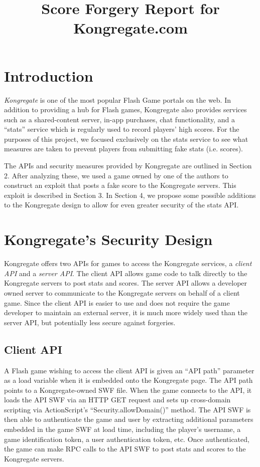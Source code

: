 \documentclass [11pt,twocolumn] {article}
\begin{document}
\title { Score Forgery Report for Kongregate.com}

\maketitle

\section { Introduction }

\emph{Kongregate} is one of the most popular Flash Game portals on the web. In addition to providing a hub for Flash games, Kongregate also provides services such as a shared-content server, in-app purchases, chat functionality, and a ``stats'' service which is regularly used to record players' high scores. For the purposes of this project, we focused exclusively on the stats service to see what measures are taken to prevent players from submitting fake stats (i.e. scores). 

The APIs and security measures provided by Kongregate are outlined in Section 2. After analyzing these, we used a game owned by one of the authors to construct an exploit that posts a fake score to the Kongregate servers. This exploit is described in Section 3. In Section 4, we propose some possible additions to the Kongregate design to allow for even greater security of the stats API. 

\section { Kongregate's Security Design }

Kongregate offers two APIs for games to access the Kongregate services, a \emph{client API} and a \emph{server API}. The client API allows game code to talk directly to the Kongregate servers to post stats and scores. The server API allows a developer owned server to communicate to the Kongregate servers on behalf of a client game. Since the client API is easier to use and does not require the game developer to maintain an external server, it is much more widely used than the server API, but potentially less secure against forgeries. 

\subsection {Client API}

A Flash game wishing to access the client API is given an ``API path'' parameter as a load variable when it is embedded onto the Kongregate page. The API path points to a Kongregate-owned SWF file. When the game connects to the API, it loads the API SWF via an HTTP GET request and sets up cross-domain scripting via ActionScript's ``Security.allowDomain()'' method. The API SWF is then able to authenticate the game and user by extracting additional parameters embedded in the game SWF at load time, including the player's username, a game identification token, a user authentication token, etc. Once authenticated, the game can make RPC calls to the API SWF to post stats and scores to the Kongregate servers. 
\end{document}
